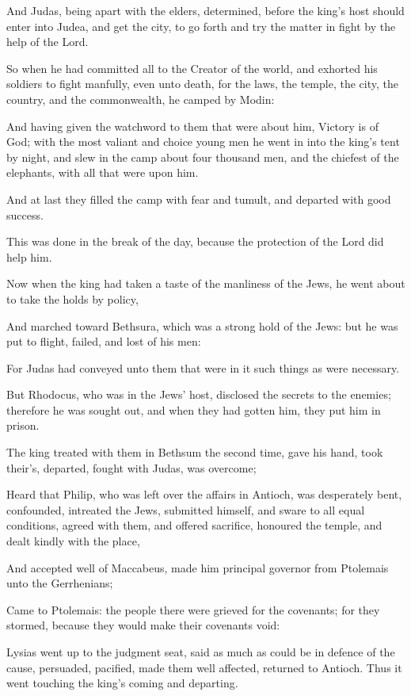 {\par }{\PP {}And Judas, being apart with the elders, determined, before the king’s host should enter into Judea, and get the city, to go forth and try the matter in fight by the help of the Lord.
\par }{\PP {}So when he had committed all to the Creator of the world, and exhorted his soldiers to fight manfully, even unto death, for the laws, the temple, the city, the country, and the commonwealth, he camped by Modin:
\par }{\PP {}And having given the watchword to them that were about him, Victory is of God; with the most valiant and choice young men he went in into the king’s tent by night, and slew in the camp about four thousand men, and the chiefest of the elephants, with all that were upon him.
\par }{\PP {}And at last they filled the camp with fear and tumult, and departed with good success.
\par }{\PP {}This was done in the break of the day, because the protection of the Lord did help him.
\par }{\PP {}Now when the king had taken a taste of the manliness of the Jews, he went about to take the holds by policy,
\par }{\PP {}And marched toward Bethsura, which was a strong hold of the Jews: but he was put to flight, failed, and lost of his men:
\par }{\PP {}For Judas had conveyed unto them that were in it such things as were necessary.
\par }{\PP {}But Rhodocus, who was in the Jews’ host, disclosed the secrets to the enemies; therefore he was sought out, and when they had gotten him, they put him in prison.
\par }{\PP {}The king treated with them in Bethsum the second time, gave his hand, took their’s, departed, fought with Judas, was overcome;
\par }{\PP {}Heard that Philip, who was left over the affairs in Antioch, was desperately bent, confounded, intreated the Jews, submitted himself, and sware to all equal conditions, agreed with them, and offered sacrifice, honoured the temple, and dealt kindly with the place,
\par }{\PP {}And accepted well of Maccabeus, made him principal governor from Ptolemais unto the Gerrhenians;
\par }{\PP {}Came to Ptolemais: the people there were grieved for the covenants; for they stormed, because they would make their covenants void:
\par }{\PP {}Lysias went up to the judgment seat, said as much as could be in defence of the cause, persuaded, pacified, made them well affected, returned to Antioch. Thus it went touching the king’s coming and departing.

}
